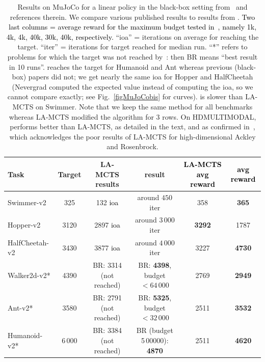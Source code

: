  \begin{table}
	    \caption{{ Results on MuJoCo for a linear policy in the black-box setting from~\cite{lamcts} and references therein. We compare various published results to results from \ngoptq{}.} \textcolor{black}{Two last {columns} = average reward for the maximum budget tested in~\cite{lamcts}, namely 1k, 4k, 4k, 40k, 30k, 40k, respectively.} ``ioa'' = iterations on average for reaching the target.  ``iter'' = iterations for target reached for median run. ``*'' refers to problems for which the target was not reached by~\cite{lamcts}: then BR means ``best result in 10 runs''. \ngoptq{} reaches the target for Humanoid and Ant whereas previous (black-box) papers did not; we get nearly the same ioa for Hopper and HalfCheetah (Nevergrad computed the expected value instead of computing the ioa, so we cannot compare exactly; see  Fig.~\ref{figMuJoCobis} for curves). \ngoptq{} is slower than LA-MCTS on Swimmer. Note that we keep the same method for all benchmarks whereas LA-MCTS modified the algorithm for 3 rows. On HDMULTIMODAL, \ngoptq{} performs better than LA-MCTS, as  detailed in the text, and as confirmed in~\cite{lamcts}, which acknowledges the poor results of LA-MCTS for high-dimensional Ackley and Rosenbrock.}
    \label{lamctsnumbers}
        \centering
        \setlength{\tabcolsep}{1pt}
       \scriptsize
\begin{tabular}{|l|c|c|c|c|c|}
		\hline
        \textbf{Task} & \textbf{Target} & \textbf{LA-MCTS results} &  \textbf{\ngoptq{} result} &\textbf{\textcolor{black}{LA-MCTS avg reward}}&\textbf{\textcolor{black}{\ngoptq{} avg reward}}\\ 
                \hline 		  \hline
        Swimmer-v2 & 325 &  132 \textcolor{black}{ioa} &     around $ 450$ iter & {{358}} & {\textbf{365}} \\   \hline
        Hopper-v2 & 3120 &  2897 \textcolor{black}{ioa}  &    around $ 3\,000$ iter & {\textbf{3292}} & 1787 \\ \hline
        HalfCheetah-v2 &  3430 &  3877 \textcolor{black}{ioa}  &  around $ 4\,000$ iter & {{3227}} & {\textbf{4730}} \\ \hline
Walker2d-v2*  & 4390 &  BR: 3314 (not reached) &  BR: \textbf{4398}, budget $<64\,000$  & 2769 & {\textbf{2949}} \\  \hline
        Ant-v2*  & 3580 &  BR: 2791 (not reached) &    BR: \textbf{5325}, budget $<32\,000$  & 2511 & {\textbf{3532}} \\ \hline
        Humanoid-v2* & 6\,000 &  BR: 3384 (not reached)&   BR (budget 5\,00000): {\textbf{4870}}  & 2511 & {\textbf{4620}}\\
        \hline
        \end{tabular}
    \end{table}
    
